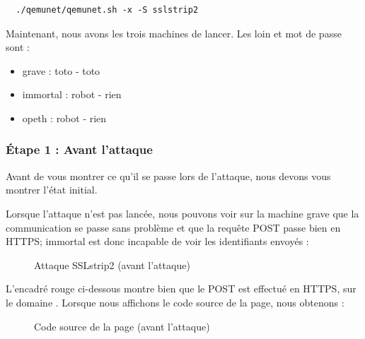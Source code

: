 \begin{verbatim}
  ./qemunet/qemunet.sh -x -S sslstrip2
\end{verbatim}

Maintenant, nous avons les trois machines de lancer. Les loin et mot de passe sont :

\begin{itemize}
\item grave : toto - toto
\item immortal : robot - rien
\item opeth : robot - rien
\end{itemize}

\subsubsection{Étape 1 : Avant l'attaque}

Avant de vous montrer ce qu'il se passe lors de l'attaque, nous devons vous montrer l'état initial.

Lorsque l'attaque n'est pas lancée, nous pouvons voir sur la machine grave que la communication se passe sans problème et que la requête POST passe bien en HTTPS; immortal est donc incapable de voir les identifiants envoyés :

\begin{figure}[H]
  \caption{Attaque SSLstrip2 (avant l'attaque)}
\end{figure}

L'encadré rouge ci-dessous montre bien que le POST est effectué en HTTPS, sur le domaine . Lorsque nous affichons le code source de la page, nous obtenons :

\begin{figure}[H]
  \caption{Code source de la page (avant l'attaque)}
\end{figure}

